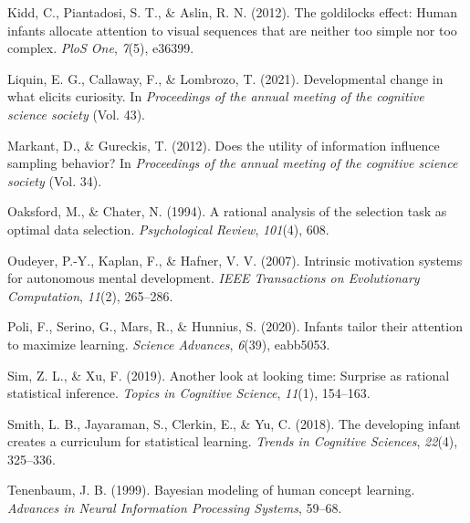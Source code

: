 \documentclass[10pt, letterpaper]{article}
\newenvironment{CSLReferences}%
  {}%
  {\par}
\begin{document}
\begin{CSLReferences}{1}{0}
\leavevmode{}%
Kidd, C., Piantadosi, S. T., \& Aslin, R. N. (2012). The goldilocks
effect: Human infants allocate attention to visual sequences that are
neither too simple nor too complex. \emph{PloS One}, \emph{7}(5),
e36399.

\leavevmode{}%
Liquin, E. G., Callaway, F., \& Lombrozo, T. (2021). Developmental
change in what elicits curiosity. In \emph{Proceedings of the annual
meeting of the cognitive science society} (Vol. 43).

\leavevmode{}%
Markant, D., \& Gureckis, T. (2012). Does the utility of information
influence sampling behavior? In \emph{Proceedings of the annual meeting
of the cognitive science society} (Vol. 34).

\leavevmode{}%
Oaksford, M., \& Chater, N. (1994). A rational analysis of the selection
task as optimal data selection. \emph{Psychological Review},
\emph{101}(4), 608.

\leavevmode{}%
Oudeyer, P.-Y., Kaplan, F., \& Hafner, V. V. (2007). Intrinsic
motivation systems for autonomous mental development. \emph{IEEE
Transactions on Evolutionary Computation}, \emph{11}(2), 265--286.

\leavevmode{}%
Poli, F., Serino, G., Mars, R., \& Hunnius, S. (2020). Infants tailor
their attention to maximize learning. \emph{Science Advances},
\emph{6}(39), eabb5053.

\leavevmode{}%
Sim, Z. L., \& Xu, F. (2019). Another look at looking time: Surprise as
rational statistical inference. \emph{Topics in Cognitive Science},
\emph{11}(1), 154--163.

\leavevmode{}%
Smith, L. B., Jayaraman, S., Clerkin, E., \& Yu, C. (2018). The
developing infant creates a curriculum for statistical learning.
\emph{Trends in Cognitive Sciences}, \emph{22}(4), 325--336.

\leavevmode{}%
Tenenbaum, J. B. (1999). Bayesian modeling of human concept learning.
\emph{Advances in Neural Information Processing Systems}, 59--68.

\end{CSLReferences}


\end{document}
